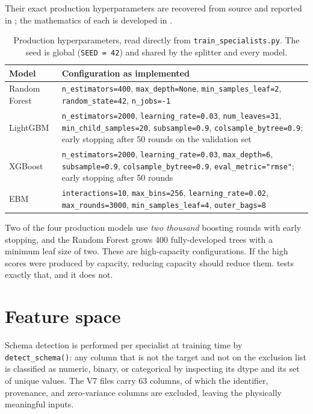 Their exact production hyperparameters are recovered from source and
reported in ; the mathematics of each is developed in
.

\begin{table}[htbp]\centering\small
\caption{Production hyperparameters, read directly from
  \texttt{train\_specialists.py}. The seed is global
  (\texttt{SEED = 42}) and shared by the splitter and every model.}
\label{tab:hparams}
\begin{tabular}{lp{9.4cm}}
\toprule
Model & Configuration as implemented \\
\midrule
Random Forest &
\texttt{n\_estimators=400}, \texttt{max\_depth=None},
\texttt{min\_samples\_leaf=2}, \texttt{random\_state=42}, \texttt{n\_jobs=-1} \\
\addlinespace[2pt]
LightGBM &
\texttt{n\_estimators=2000}, \texttt{learning\_rate=0.03},
\texttt{num\_leaves=31}, \texttt{min\_child\_samples=20},
\texttt{subsample=0.9}, \texttt{colsample\_bytree=0.9};
early stopping after 50 rounds on the validation set \\
\addlinespace[2pt]
XGBoost &
\texttt{n\_estimators=2000}, \texttt{learning\_rate=0.03},
\texttt{max\_depth=6}, \texttt{subsample=0.9},
\texttt{colsample\_bytree=0.9}, \texttt{eval\_metric="rmse"};
early stopping after 50 rounds \\
\addlinespace[2pt]
EBM &
\texttt{interactions=10}, \texttt{max\_bins=256},
\texttt{learning\_rate=0.02}, \texttt{max\_rounds=3000},
\texttt{min\_samples\_leaf=4}, \texttt{outer\_bags=8} \\
\bottomrule
\end{tabular}
\end{table}

\begin{findingbox}[title=Note on capacity]
Two of the four production models use \emph{two thousand} boosting rounds
with early stopping, and the Random Forest grows 400 fully-developed trees
with a minimum leaf size of two. These are high-capacity configurations.
If the high scores were produced by capacity, reducing capacity should
reduce them.  tests exactly that, and it does not.
\end{findingbox}

\section{Feature space}

Schema detection is performed per specialist at training time by
\texttt{detect\_schema()}: any column that is not the target and not on the
exclusion list is classified as numeric, binary, or categorical by
inspecting its dtype and its set of unique values. The V7 files carry 63
columns, of which the identifier, provenance, and zero-variance columns are
excluded, leaving the physically meaningful inputs.

